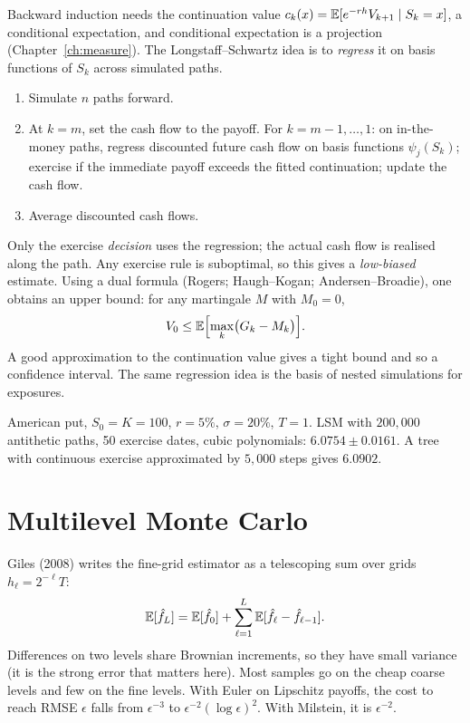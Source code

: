 Backward induction needs the continuation value $c_k(x)=\mathbb{E}[e^{-rh}V_{k+1}\mid S_k=x]$, a conditional expectation, and conditional expectation is a projection (Chapter~\ref{ch:measure}). The Longstaff--Schwartz idea is to \emph{regress} it on basis functions of $S_k$ across simulated paths.
\begin{enumerate}
\item Simulate $n$ paths forward.
\item At $k=m$, set the cash flow to the payoff. For $k=m-1,\dots,1$: on in-the-money paths, regress discounted future cash flow on basis functions $\psi_j(S_k)$; exercise if the immediate payoff exceeds the fitted continuation; update the cash flow.
\item Average discounted cash flows.
\end{enumerate}
Only the exercise \emph{decision} uses the regression; the actual cash flow is realised along the path. Any exercise rule is suboptimal, so this gives a \emph{low-biased} estimate. Using a dual formula (Rogers; Haugh--Kogan; Andersen--Broadie), one obtains an upper bound: for any martingale $M$ with $M_0=0$,
\[
V_0\le\mathbb{E}\Bigl[\max_k\bigl(G_k-M_k\bigr)\Bigr].
\]
A good approximation to the continuation value gives a tight bound and so a confidence interval. The same regression idea is the basis of nested simulations for exposures.

\begin{numcheck}
American put, $S_0=K=100$, $r=5\%$, $\sigma=20\%$, $T=1$. LSM with $200{,}000$ antithetic paths, 50 exercise dates, cubic polynomials: $6.0754\pm0.0161$. A tree with continuous exercise approximated by $5{,}000$ steps gives $6.0902$.
\end{numcheck}

\section{Multilevel Monte Carlo}

Giles (2008) writes the fine-grid estimator as a telescoping sum over grids $h_\ell=2^{-\ell}T$:
\[
\mathbb{E}[\hat f_L]=\mathbb{E}[\hat f_0]+\sum_{\ell=1}^L\mathbb{E}[\hat f_\ell-\hat f_{\ell-1}].
\]
Differences on two levels share Brownian increments, so they have small variance (it is the strong error that matters here). Most samples go on the cheap coarse levels and few on the fine levels. With Euler on Lipschitz payoffs, the cost to reach RMSE $\epsilon$ falls from $\epsilon^{-3}$ to $\epsilon^{-2}(\log\epsilon)^2$. With Milstein, it is $\epsilon^{-2}$.

